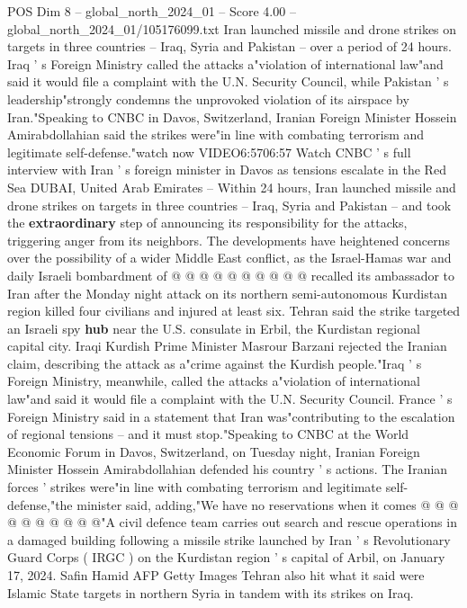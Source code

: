 \begin{textsample}{POS Dim 8 – global\_north\_2024\_01 – Score 4.00 – global\_north\_2024\_01/105176099.txt}  \label{ex:f8_pos_239}
Iran launched missile and drone strikes on targets in three countries -- Iraq, Syria and Pakistan -- over a period of 24 hours.
Iraq ' s Foreign Ministry called the attacks a"violation of international law"and said it would file a complaint with the U.N.
Security Council, while Pakistan ' s leadership"strongly condemns the unprovoked violation of its airspace by Iran."Speaking to CNBC in Davos, Switzerland, Iranian Foreign Minister Hossein Amirabdollahian said the strikes were"in line with combating terrorism and legitimate self-defense."watch now VIDEO6:5706:57 Watch CNBC ' s full interview with Iran ' s foreign minister in Davos as tensions escalate in the Red Sea DUBAI, United Arab Emirates -- Within 24 hours, Iran launched missile and drone strikes on targets in three countries -- Iraq, Syria and Pakistan -- and took the \textbf{extraordinary} step of announcing its responsibility for the attacks, triggering anger from its neighbors.
The developments have heightened concerns over the possibility of a wider Middle East conflict, as the Israel-Hamas war and daily Israeli bombardment of @ @ @ @ @ @ @ @ @ @ recalled its ambassador to Iran after the Monday night attack on its northern semi-autonomous Kurdistan region killed four civilians and injured at least six.
Tehran said the strike targeted an Israeli spy \textbf{hub} near the U.S. consulate in Erbil, the Kurdistan regional capital city.
Iraqi Kurdish Prime Minister Masrour Barzani rejected the Iranian claim, describing the attack as a"crime against the Kurdish people."Iraq ' s Foreign Ministry, meanwhile, called the attacks a"violation of international law"and said it would file a complaint with the U.N.
Security Council.
France ' s Foreign Ministry said in a statement that Iran was"contributing to the escalation of regional tensions -- and it must stop."Speaking to CNBC at the World Economic Forum in Davos, Switzerland, on Tuesday night, Iranian Foreign Minister Hossein Amirabdollahian defended his country ' s actions.
The Iranian forces ' strikes were"in line with combating terrorism and legitimate self-defense,"the minister said, adding,"We have no reservations when it comes @ @ @ @ @ @ @ @ @ @"A civil defence team carries out search and rescue operations in a damaged building following a missile strike launched by Iran ' s Revolutionary Guard Corps ( IRGC ) on the Kurdistan region ' s capital of Arbil, on January 17, 2024.
Safin Hamid AFP Getty Images Tehran also hit what it said were Islamic State targets in northern Syria in tandem with its strikes on Iraq.

\end{textsample}
